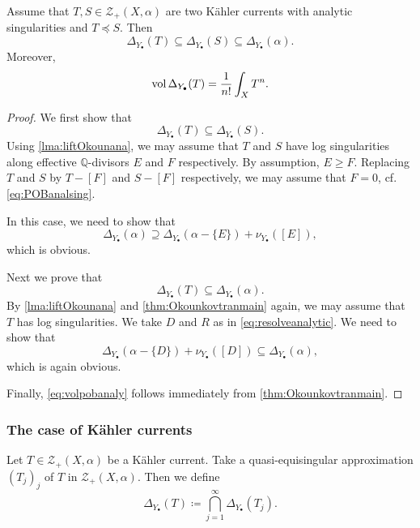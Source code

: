 \begin{lemma}\label{lma:Okounkovanalycomp}
    Assume that $T,S\in \mathcal{Z}_+(X,\alpha)$ are two Kähler currents with analytic singularities and $T\preceq S$. Then
    \[
    \Delta_{Y_{\bullet}}(T)\subseteq \Delta_{Y_{\bullet}}(S)\subseteq \Delta_{Y_{\bullet}}(\alpha).
    \]
    Moreover,
    \begin{equation}\label{eq:volpobanaly}
\operatorname{vol} \Delta_{Y_{\bullet}}(T)=\frac{1}{n!} \int_X T^n.
\end{equation}
\end{lemma}
\begin{proof}
    We first show that
    \[
    \Delta_{Y_{\bullet}}(T)\subseteq \Delta_{Y_{\bullet}}(S).
    \]
    Using \cref{lma:liftOkounana}, we may assume that $T$ and $S$ have log singularities along effective $\mathbb{Q}$-divisors $E$ and $F$ respectively. By assumption, $E\geq F$. Replacing $T$ and $S$ by $T-[F]$ and $S-[F]$ respectively, we may assume that $F=0$, cf. \eqref{eq:POBanalsing}.

    In this case, we need to show that
    \[
    \Delta_{Y_{\bullet}}(\alpha)\supseteq \Delta_{Y_{\bullet}}(\alpha-\{E\})+\nu_{Y_{\bullet}}([E]),
    \]
    which is obvious.

    Next we prove that
    \[
    \Delta_{Y_{\bullet}}(T)\subseteq \Delta_{Y_{\bullet}}(\alpha).
    \]
    By \cref{lma:liftOkounana} and \cref{thm:Okounkovtranmain} again, we may assume that $T$ has log singularities. We take $D$ and $R$ as in \eqref{eq:resolveanalytic}. We need to show that
    \[
    \Delta_{Y_{\bullet}}(\alpha-\{D\})+\nu_{Y_{\bullet}}([D])\subseteq \Delta_{Y_{\bullet}}(\alpha),
    \]
    which is again obvious.

    Finally, \eqref{eq:volpobanaly} follows immediately from \cref{thm:Okounkovtranmain}.
\end{proof}

\subsubsection{The case of Kähler currents}
\label{subsubsec:tpob_Kahler}

\begin{definition}\label{def:POBKahcurr}
     Let $T\in \mathcal{Z}_+(X,\alpha)$ be a Kähler current. Take a quasi-equisingular approximation $(T_j)_j$ of $T$ in $\mathcal{Z}_+(X,\alpha)$. Then we define
    \[
        \Delta_{Y_{\bullet}}(T)\coloneqq \bigcap_{j=1}^{\infty}\Delta_{Y_{\bullet}}(T_j).
    \]
\end{definition}

